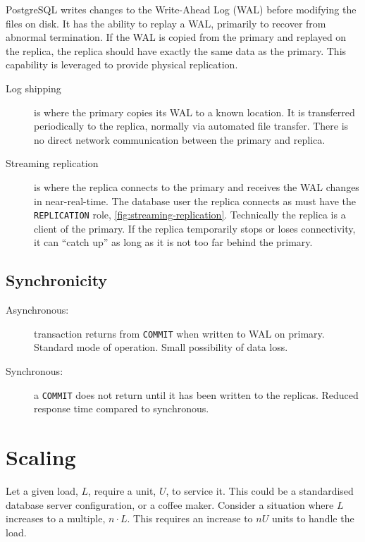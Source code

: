 PostgreSQL writes changes to the Write-Ahead Log (WAL) before modifying the files on disk.
It has the ability to replay a WAL, primarily to recover from abnormal termination.
If the WAL is copied from the primary and replayed on the replica, the replica should have exactly the same data as the primary.
This capability is leveraged to provide physical replication.
\begin{description}
\item[Log shipping] is where the primary copies its WAL to a known location.
  It is transferred periodically to the replica, normally via automated file transfer.
  There is no direct network communication between the primary and replica.
\item[Streaming replication] is where the replica connects to the primary and receives the WAL changes in near-real-time.
  The database user the replica connects as must have the \texttt{REPLICATION} role, \autoref{fig:streaming-replication}.
  Technically the replica is a client of the primary.
  If the replica temporarily stops or loses connectivity, it can ``catch up'' as long as it is not too far behind the primary.
\end{description}


\subsection{Synchronicity}

\begin{description}
\item[Asynchronous:] transaction returns from \texttt{COMMIT} when written to WAL on primary. Standard mode of operation. Small possibility of data loss.
\item[Synchronous:] a \texttt{COMMIT} does not return until it has been written to the replicas. Reduced response time compared to synchronous.
\end{description}

\section{Scaling}

Let a given load, $L$, require a unit, $U$, to service it. 
This could be a standardised database server configuration, or a coffee maker.
Consider a situation where $L$ increases to a multiple, $n \cdot L$.
This requires an increase to $nU$ units to handle the load.

